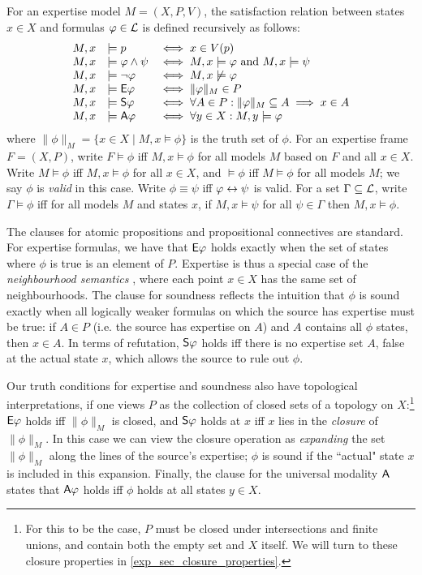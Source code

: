 For an expertise model $M = (X, P, V)$, the satisfaction relation between
states $x \in X$ and formulas $\phi \in \cL$ is defined recursively
as follows:
\[
    \begin{array}{lll}
     M, x &\models p &\iff x \in V(p) \\
     M, x &\models \phi \land \psi &\iff M, x \models \phi \text{ and } M, x
         \models \psi \\
     M, x &\models \neg\phi &\iff M, x \not\models \phi \\
     M, x &\models \E\phi &\iff \|\phi\|_M \in P \\
     M, x &\models \S\phi &\iff \forall A \in P: \|\phi\|_M \subseteq A \implies
         x \in A \\
     M, x &\models \A\phi &\iff \forall y \in X: M, y \models \phi
    \end{array}
\]
where $\|\phi\|_M = \{x \in X \mid M, x \models \phi\}$ is the truth set
of $\phi$. For an expertise frame $F = (X, P)$, write $F
\models \phi$ iff $M, x \models \phi$ for all models $M$ based on
$F$ and all $x \in X$. Write $M \models \phi$ iff
$M, x \models \phi$ for all $x \in X$, and $\models \phi$ iff
$M \models \phi$ for all models $M$; we say $\phi$ is \emph{valid}
in this case. Write $\phi \equiv \psi$ iff $\phi \liff \psi$ is
valid. For a set $\Gamma \subseteq \cL$, write $\Gamma \models
\phi$ iff for all models $M$ and states $x$, if $M, x \models
\psi$ for all $\psi \in \Gamma$ then $M, x \models \phi$.

The clauses for atomic propositions and propositional
connectives are standard. For expertise formulas, we have that $\E\phi$
holds exactly when the set of states where $\phi$ is true is an element
of $P$. Expertise is thus a special case of the \emph{neighbourhood semantics}
\cite{pacuit2017neighborhood}, where each point $x \in X$ has the same
set of neighbourhoods. The clause for soundness reflects the intuition that
$\phi$ is sound exactly when all logically weaker formulas on which the
source has expertise must be true: if $A \in P$ (i.e. the source has
expertise on $A$) and $A$ contains all $\phi$ states, then
$x \in A$. In terms of refutation, $\S\phi$ holds iff there is no
expertise set $A$, false at the actual state $x$, which allows the
source to rule out $\phi$.

Our truth conditions for expertise and soundness also have topological
interpretations, if one views $P$ as the collection of closed sets of a
topology on $X$:\footnote{For this to be the case, $P$ must be closed under
intersections and finite unions, and contain both the empty set and $X$ itself.
We will turn to these closure properties in \cref{exp_sec_closure_properties}.} $\E\phi$ holds
iff $\|\phi\|_M$ is closed, and $\S\phi$ holds at $x$ iff $x$ lies in the
\emph{closure} of $\|\phi\|_M$.\footnotemark{} In this case we can view the
closure operation as \emph{expanding} the set $\|\phi\|_M$ along the lines of
the source's expertise; $\phi$ is sound if the ``actual" state $x$ is included
in this expansion.
%
Finally, the clause for the universal modality $\A$ states that $\A\phi$ holds
iff $\phi$ holds at all states $y \in X$.

